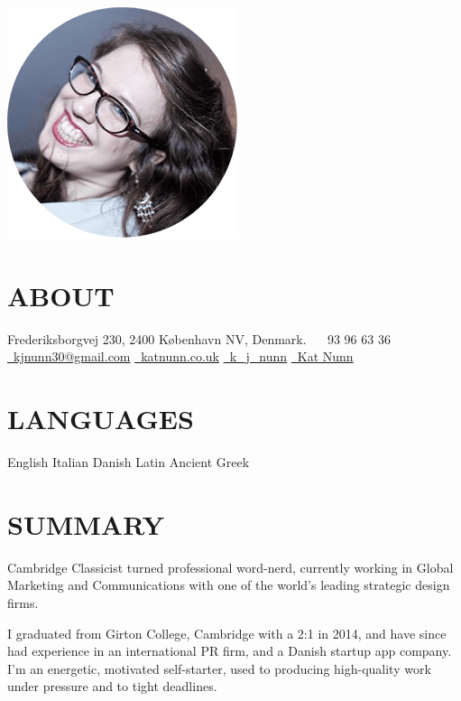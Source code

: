 \documentclass[]{friggeri-cv}
\begin{document}
       {}

\begin{aside}
  \includegraphics[width=.66\textwidth]{../img/profile.png}
  \section{ABOUT}
    Frederiksborgvej 230,
    2400 København NV,
    Denmark.
    ~
	\faPhone~93 96 63 36
	\href{mailto:kjnunn30@gmail.com}{\faEnvelope~kjnunn30@gmail.com}
	\href{https://katnunn.co.uk}{\faGlobe~katnunn.co.uk}
	\href{https://twitter.com/k\_j\_nunn}{\faTwitter~k\_j\_nunn}
	\href{http://uk.linkedin.com/in/katnunn/}{\faLinkedin~Kat Nunn}
  \section{LANGUAGES}
    English
    Italian
    Danish
    Latin
    Ancient Greek
\end{aside}

\section{SUMMARY}
Cambridge Classicist turned professional word-nerd, currently working in Global Marketing and Communications with one of the world's leading strategic \mbox{design} firms. 

I graduated from Girton College, Cambridge with a 2:1 in 2014, and have since had experience in an international PR firm, and a Danish startup app company. I’m an energetic, motivated self-starter, used to producing high-quality work under pressure and to tight deadlines.
\end{document}
